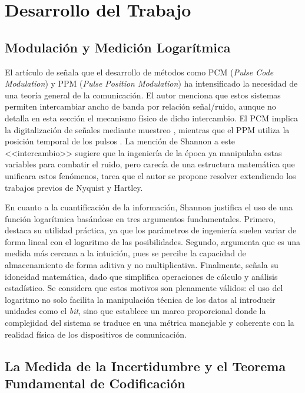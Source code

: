 \documentclass[11pt,a4paper,spanish]{book}
\begin{document}
\chapter{Desarrollo del Trabajo}

\section{Modulación y Medición Logarítmica}

El artículo de \cite{shannon1948} señala que el desarrollo de métodos como PCM (\textit{Pulse Code Modulation}) y PPM (\textit{Pulse Position Modulation}) ha intensificado la necesidad de una teoría general de la comunicación. El autor menciona que estos sistemas permiten intercambiar ancho de banda por relación señal/ruido, aunque no detalla en esta sección el mecanismo físico de dicho intercambio. El PCM implica la digitalización de señales mediante muestreo \cite{reeves1942}, mientras que el PPM utiliza la posición temporal de los pulsos \cite{deloraine1941}. La mención de Shannon a este <<intercambio>> sugiere que la ingeniería de la época ya manipulaba estas variables para combatir el ruido, pero carecía de una estructura matemática que unificara estos fenómenos, tarea que el autor se propone resolver extendiendo los trabajos previos de Nyquist y Hartley.

En cuanto a la cuantificación de la información, Shannon justifica el uso de una función logarítmica basándose en tres argumentos fundamentales. Primero, destaca su utilidad práctica, ya que los parámetros de ingeniería suelen variar de forma lineal con el logaritmo de las posibilidades. Segundo, argumenta que es una medida más cercana a la intuición, pues se percibe la capacidad de almacenamiento de forma aditiva y no multiplicativa. Finalmente, señala su idoneidad matemática, dado que simplifica operaciones de cálculo y análisis estadístico. Se considera que estos motivos son plenamente válidos: el uso del logaritmo no solo facilita la manipulación técnica de los datos al introducir unidades como el \textit{bit}, sino que establece un marco proporcional donde la complejidad del sistema se traduce en una métrica manejable y coherente con la realidad física de los dispositivos de comunicación.

\section{La Medida de la Incertidumbre y el Teorema Fundamental de Codificación}
\end{document}
